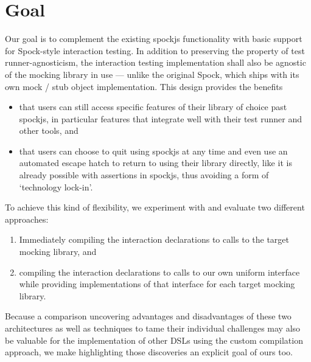 \section{Goal}
Our goal is to complement the existing spockjs functionality
with basic support for Spock-style interaction testing.
In addition to preserving the property of test runner-agnosticism,
the interaction testing implementation shall also be
agnostic of the mocking library in use ---
unlike the original Spock,
which ships with its own mock / stub object implementation.
This design provides the benefits
\begin{itemize}
  \item that users can still access specific features
    of their library of choice past spockjs,
    in particular features that integrate well with
    their test runner and other tools, and
  \item that users can choose to quit using spockjs at any time
    and even use an automated escape hatch to return to using their library directly,
    like it is already possible with assertions in spockjs,
    thus avoiding a form of `technology lock-in'.
\end{itemize}

To achieve this kind of flexibility,
we experiment with and evaluate two different approaches:
\begin{enumerate}
  \item Immediately compiling the interaction declarations
    to calls to the target mocking library, and
  \item compiling the interaction declarations
    to calls to our own uniform interface
    while providing implementations
    of that interface
    for each target mocking library.
\end{enumerate}
Because a comparison uncovering advantages and disadvantages of these two architectures
as well as techniques to tame their individual challenges
may also be valuable for the implementation of other DSLs
using the custom compilation approach,
we make highlighting those discoveries an explicit goal of ours too.
